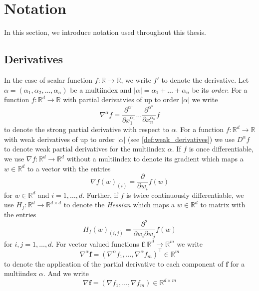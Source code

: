 \documentclass[12pt]{article}
\theoremstyle{definition}
\numberwithin{equation}{section}
\newcommand{\R}{\mathbb{R}}
\newcommand{\T}{\mathsf{T}}
\begin{document}
\section{Notation}
\label{sec:notation}
In this section, we introduce notation used throughout this thesis.
\subsection{Derivatives}
In the case of scalar function $f: \R \rightarrow \R$, we write $f'$ to denote the derivative.
Let $\alpha = (\alpha_1, \alpha_2, \dots, \alpha_n)$ be a multiindex and $|\alpha| = \alpha_1 + \dots + \alpha_n$ be its \emph{order}. For a function $f : \R^d \rightarrow \R$ with partial derivatvies of up to order $|\alpha|$ we write
\begin{equation*}
  \nabla^{\alpha} f = \frac{\partial^{\alpha^1}}{\partial x_1^{\alpha_1}}\dots\frac{\partial^{\alpha^n}}{\partial x_n^{\alpha_n}} f
\end{equation*}
to denote the strong partial derivative with respect to $\alpha$. For a function $f:\R^d \rightarrow \R$  with weak derivatives of up to order $|\alpha|$ (see \autoref{def:weak_derivatives}) we use $D^{\alpha}f$ to denote weak partial derivatives for the multiindex $\alpha$. 
If $f$ is once differentiable, we use $\nabla f : \R^d \rightarrow \R^d$ without a multiindex to denote its gradient which maps a $w \in \R^d$ to a vector with the entries
\begin{equation*}
  \nabla f(w)_{(i)} = \frac{\partial}{\partial w_i} f(w)  
\end{equation*}
 for $w \in \R^d$ and $i=1,\dots,d$. Further, if $f$ is twice continuously differentiable, we use $H_f : \R^d \rightarrow \R^{d \times d}$ to denote the \emph{Hessian} which maps a $w \in \R^d$ to matrix with the entries 
 \begin{equation*}
  H_f(w)_{(i,j)} = \frac{\partial^2}{\partial w_i \partial w_j} f(w)
 \end{equation*}
 for $i,j=1,\dots,d$. For vector valued functions $\mathbf{f} : \R^d \rightarrow \R^m$ we write 
 \begin{equation*}
  \nabla^{\alpha}\mathbf{f} = (\nabla^{\alpha}f_1, \dots, \nabla^{\alpha}f_m)^\T \in \R^{m}
 \end{equation*}
 to denote the application of the partial derivative to each component of $\mathbf{f}$ for a multiindex $\alpha$. And we write 
 \begin{equation*}
  \nabla \mathbf{f} = (\nabla f_1, \dots, \nabla f_m) \in \R^{d \times m}
 \end{equation*}
\end{document}
